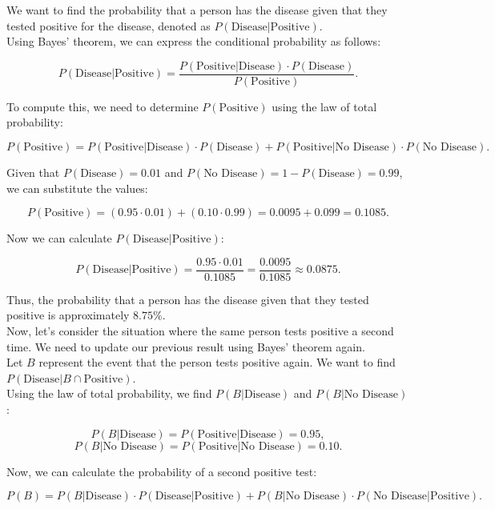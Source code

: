 We want to find the probability that a person has the disease given that they tested positive for the disease, denoted as \(P(\text{Disease} | \text{Positive})\).\\

Using Bayes' theorem, we can express the conditional probability as follows:

\[
P(\text{Disease} | \text{Positive}) = \frac{P(\text{Positive} | \text{Disease}) \cdot P(\text{Disease})}{P(\text{Positive})}.
\]

To compute this, we need to determine \(P(\text{Positive})\) using the law of total probability:

\[
P(\text{Positive}) = P(\text{Positive} | \text{Disease}) \cdot P(\text{Disease}) + P(\text{Positive} | \text{No Disease}) \cdot P(\text{No Disease}).
\]

Given that \(P(\text{Disease}) = 0.01\) and \(P(\text{No Disease}) = 1 - P(\text{Disease}) = 0.99\), we can substitute the values:

\[
P(\text{Positive}) = (0.95 \cdot 0.01) + (0.10 \cdot 0.99) = 0.0095 + 0.099 = 0.1085.
\]

Now we can calculate \(P(\text{Disease} | \text{Positive})\):

\[
P(\text{Disease} | \text{Positive}) = \frac{0.95 \cdot 0.01}{0.1085} = \frac{0.0095}{0.1085} \approx 0.0875.
\]

Thus, the probability that a person has the disease given that they tested positive is approximately \(8.75\%\).\\

Now, let's consider the situation where the same person tests positive a second time. We need to update our previous result using Bayes' theorem again. \\

Let \(B\) represent the event that the person tests positive again. We want to find \(P(\text{Disease} | B \cap \text{Positive})\). \\

Using the law of total probability, we find \(P(B | \text{Disease})\) and \(P(B | \text{No Disease})\): 

\[
P(B | \text{Disease}) = P(\text{Positive} | \text{Disease}) = 0.95,
\]
\[
P(B | \text{No Disease}) = P(\text{Positive} | \text{No Disease}) = 0.10.
\]

Now, we can calculate the probability of a second positive test:

\[
P(B) = P(B | \text{Disease}) \cdot P(\text{Disease} | \text{Positive}) + P(B | \text{No Disease}) \cdot P(\text{No Disease} | \text{Positive}).
\]

